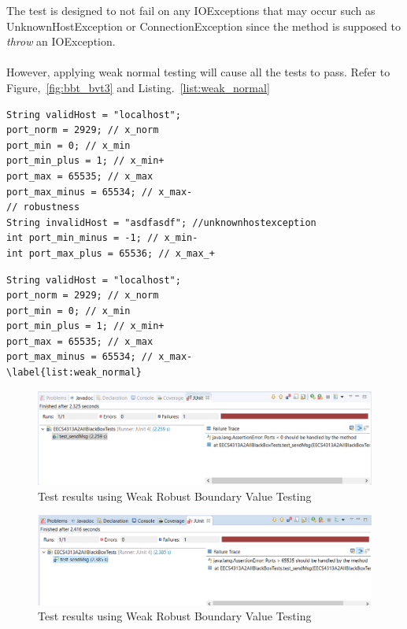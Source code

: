 \documentclass[fontsize=12pt,paper=letter,twoside]{scrartcl}
\begin{document}
\begin{itemize}
The test is designed to not fail on any  \mbox{IOExceptions} that may occur such as \mbox{UnknownHostException} or \mbox{ConnectionException} since the method is supposed to \emph{throw} an \mbox{IOException}. \\ \\
However, applying weak normal testing will cause all the tests to pass. Refer to Figure,~\ref{fig:bbt_bvt3} and Listing.~\ref{list:weak_normal}
\newpage
\begin{lstlisting}[caption={Weak Robust Testing Variables},label={list:weak_robust}]
String validHost = "localhost";
port_norm = 2929; // x_norm
port_min = 0; // x_min
port_min_plus = 1; // x_min+
port_max = 65535; // x_max
port_max_minus = 65534; // x_max-
// robustness
String invalidHost = "asdfasdf"; //unknownhostexception
int port_min_minus = -1; // x_min-
int port_max_plus = 65536; // x_max_+

\end{lstlisting}

\begin{lstlisting}[caption={Weak Normal Testing Variables},label={list:weak_normal}]
String validHost = "localhost";
port_norm = 2929; // x_norm
port_min = 0; // x_min
port_min_plus = 1; // x_min+
port_max = 65535; // x_max
port_max_minus = 65534; // x_max-
\label{list:weak_normal}
\end{lstlisting}
\newpage
\begin{figure}[!htb]
\begin{center}
\includegraphics[width=.99\textwidth]{images/bbt/bvt-fail-1.png}
\end{center}
\caption{Test results using Weak Robust Boundary Value Testing}
\label{fig:bbt_bvt1}
\end{figure}

\begin{figure}[!htb]
\begin{center}
\includegraphics[width=.99\textwidth]{images/bbt/bvt-fail-2.png}
\end{center}
\caption{Test results using Weak Robust Boundary Value Testing}
\label{fig:bbt_bvt2}
\end{figure}


\end{itemize}
\end{document}
